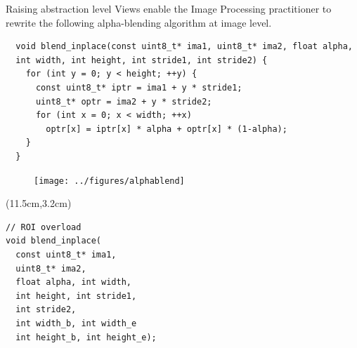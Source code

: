 \documentclass[12pt,aspectratio=169]{beamer}
\begin{document}
\begin{frame}[fragile]{Raising abstraction level}
  Views enable the Image Processing practitioner to rewrite the following alpha-blending algorithm at image level.
  \begin{verbatim}
  void blend_inplace(const uint8_t* ima1, uint8_t* ima2, float alpha,
  int width, int height, int stride1, int stride2) {
    for (int y = 0; y < height; ++y) {
      const uint8_t* iptr = ima1 + y * stride1;
      uint8_t* optr = ima2 + y * stride2;
      for (int x = 0; x < width; ++x)
        optr[x] = iptr[x] * alpha + optr[x] * (1-alpha);
    }
  }
  \end{verbatim}
  \begin{figure}
    \flushleft
    \texttt{[image: ../figures/alphablend]}
  \end{figure}
  \begin{textblock*}{4.5cm}(11.5cm,3.2cm)
    \begin{verbatim}
// ROI overload
void blend_inplace(
  const uint8_t* ima1,
  uint8_t* ima2,
  float alpha, int width,
  int height, int stride1,
  int stride2,
  int width_b, int width_e
  int height_b, int height_e);
    \end{verbatim}
  \end{textblock*}
\end{frame}
\end{document}
